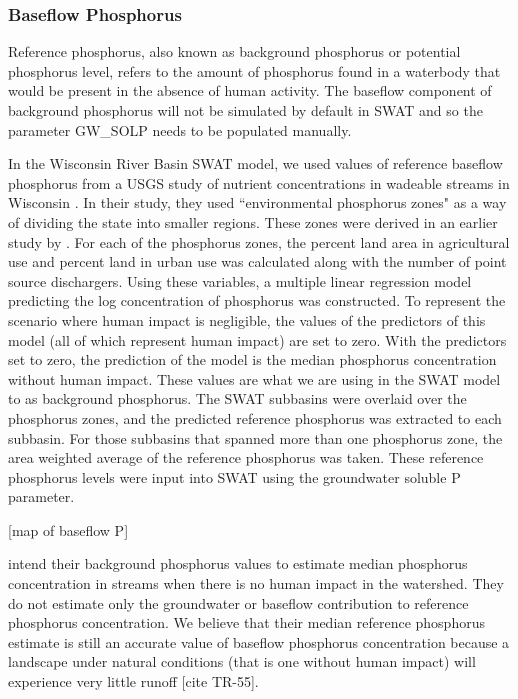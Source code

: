 \subsubsection{Baseflow Phosphorus}
	Reference phosphorus, also known as background phosphorus or potential phosphorus level, refers to the amount of phosphorus found in a waterbody that would be present in the absence of human activity. The baseflow component of background phosphorus will not be simulated by default in SWAT and so the parameter GW\_SOLP needs to be populated manually. 
	
	In the Wisconsin River Basin SWAT model, we used values of reference baseflow phosphorus from a USGS study of nutrient concentrations in wadeable streams in Wisconsin \citet{robertson_wadeable_2006}. In their study, they used ``environmental phosphorus zones" as a way of dividing the state into smaller regions. These zones were derived in an earlier study by \citet{robertson_phosphoruszones_2006}. 
	For each of the phosphorus zones, the percent land area in agricultural use and percent land in urban use was calculated along with the number of point source dischargers. Using these variables, a multiple linear regression model predicting the log concentration of phosphorus was constructed. To represent the scenario where human impact is negligible, the values of the predictors of this model (all of which represent human impact) are set to zero. With the predictors set to zero, the prediction of the model is the median phosphorus concentration without human impact.	These values are what we are using in the SWAT model to as background phosphorus. The SWAT subbasins were overlaid over the phosphorus zones, and the predicted reference phosphorus was extracted to each subbasin. For those subbasins that spanned more than one phosphorus zone, the area weighted average of the reference phosphorus was taken. These reference phosphorus levels were input into SWAT using the groundwater soluble P parameter.
	
	[map of baseflow P]
	
	\citet{robertson_wadeable_2006} intend their background phosphorus values to estimate median phosphorus concentration in streams when there is no human impact in the watershed. They do not estimate only the groundwater or baseflow contribution to reference phosphorus concentration. We believe that their median reference phosphorus estimate is still an accurate value of baseflow phosphorus concentration because a landscape under natural conditions (that is one without human impact) will experience very little runoff [cite TR-55].
	
	
	
	